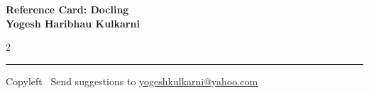 \documentclass[8pt,landscape]{article}
\begin{document}
\footnotesize


\begin{center}
\Large{\textbf{Reference Card: Docling\\ Yogesh Haribhau Kulkarni}}  
\end{center}

\begin{multicols}{2}

% 
\end{multicols}

\rule{\linewidth}{0.25pt}
\scriptsize
Copyleft \textcopyleft\  Send suggestions to 
\href{http://www.yogeshkulkarni.com}{yogeshkulkarni@yahoo.com}
\end{document}
